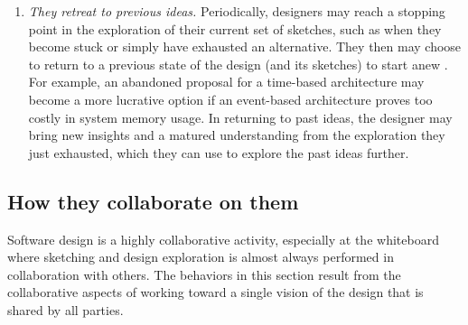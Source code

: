 \begin{enumerate}
 \item \emph{They retreat to previous ideas.} Periodically, designers may reach a stopping point in the exploration of their current set of sketches, such as when they become stuck or simply have exhausted an alternative. They then may choose to return to a previous state of the design (and its sketches) to start anew \cite{zannier2007model}. For example, an abandoned proposal for a time-based architecture may become a more lucrative option if an event-based architecture proves too costly in system memory usage. In returning to past ideas, the designer may bring new insights and a matured understanding from the exploration they just exhausted, which they can use to explore the past ideas further.
 \end{enumerate}

\subsection{How they collaborate on them}

Software design is a highly collaborative activity, especially at the whiteboard where sketching and design exploration is almost always performed in collaboration with others. The behaviors in this section result from the collaborative aspects of working toward a single vision of the design that is shared by all parties.

